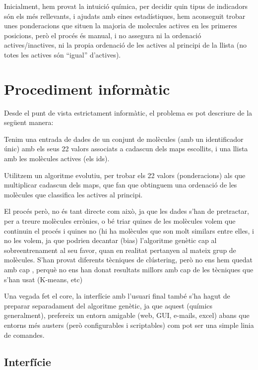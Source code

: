 \documentclass[titlepage,a4paper,12pt]{book}
\begin{document}

Inicialment, hem provat la intuició química, per decidir quin tipus de
indicadors són els més rellevants, i ajudats amb eines estadístiques, hem
aconseguit trobar unes ponderacions que situen la majoria de molecules actives
en les primeres posicions, però el procés és manual, i no assegura ni la
ordenació actives/inactives, ni la propia ordenació de les actives al principi
de la llista (no totes les actives són ``igual'' d'actives).


\section{Procediment informàtic} %
\label{sec:Procediment informatic}

Desde el punt de vista estrictament informàtic, el problema es pot descriure de
la següent manera:

Tenim una entrada de dades de un conjunt de molècules (amb un identificador
únic) amb els seus 22 valors associats a cadascun dels maps escollits, i una
llista amb les molècules actives (els ids).

Utilitzem un algoritme evolutiu, per trobar els 22 valors (ponderacions) als que
multiplicar cadascun dels maps, que fan que obtinguem una ordenació de les
molècules que classifica les actives al principi.

El procés però, no és tant directe com això, ja que les dades s'han de
pretractar, per a treure molècules errònies, o bé triar quines de les molècules
volem que continuin el procés i quines no (hi ha molècules que son molt similars
entre elles, i no les volem, ja que podrien decantar (bias) l'algoritme genètic cap al
sobreentrenament al seu favor, quan en realitat pertanyen al mateix grup de
molècules.  S'han provat diferents tècniques de clústering, però no ens hem
quedat amb cap , perquè no ens han donat resultats millors amb cap de les
tècniques que s'han usat (K-means, etc) %

Una vegada fet el core, la interfície amb l'usuari final també s'ha hagut
de preparar separadament del algoritme genètic, ja que aquest (químics
generalment), prefereix un entorn amigable (web, GUI, e-mails, excel) abans que
entorns més austers (però configurables i scriptables) com pot ser una simple
linia de comandes.  

\subsection{Interfície} %
\label{sub:Interficie}
\end{document}
